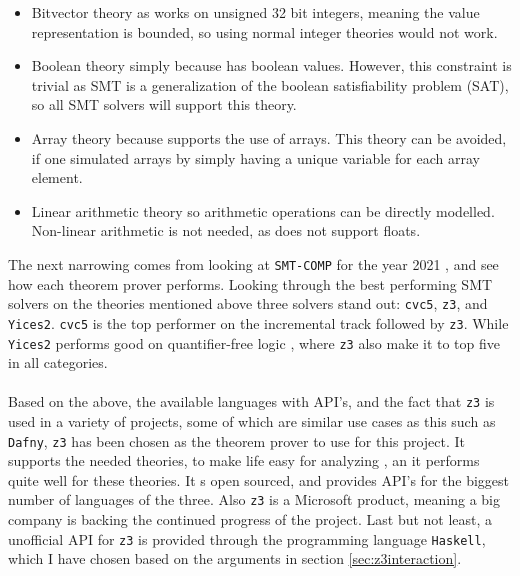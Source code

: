 \begin{itemize}
    \item Bitvector theory as \lan works on unsigned 32 bit integers, meaning the value
          representation is bounded, so using normal integer theories would not work.

    \item Boolean theory simply because \lan has boolean values. However, this constraint is
          trivial as SMT is a generalization of the boolean satisfiability problem (SAT), so
          all SMT solvers will support this theory.

    \item Array theory because \lan supports the use of arrays. This theory can be avoided, if
          one simulated arrays by simply having a unique variable for each array element.

    \item Linear arithmetic theory so arithmetic operations can be directly modelled. Non-linear
          arithmetic is not needed, as \lan does not support floats.
\end{itemize}
\noindent
The next narrowing comes from looking at \texttt{SMT-COMP} for the year 2021 \cite{smtcomp}, and see
how each theorem prover performs. Looking through the best performing SMT solvers on the theories
mentioned above three solvers stand out: \texttt{cvc5}, \texttt{z3}, and \texttt{Yices2}.
\texttt{cvc5} is the top performer on the incremental track \cite{smtcomincr} followed by
\texttt{z3}. While \texttt{Yices2} performs good on quantifier-free logic \cite{smtcommod},
where \texttt{z3} also make it to top five in all categories.
\\
\\
Based on the above, the available languages with API's, and the fact that \texttt{z3} is used in
a variety of projects, some of which are similar use cases as this such as \texttt{Dafny},
\texttt{z3} has been chosen as the theorem prover to use for this project. It supports the
needed theories, to make life easy for analyzing \lan, an it performs quite well for these
theories. It s open sourced, and provides API's for the biggest number of languages of the three.
Also \texttt{z3} is a Microsoft product, meaning a big company is backing the continued
progress of the project. Last but not least, a unofficial API for \texttt{z3} is provided
through the programming language \texttt{Haskell}, which I have chosen based on the arguments
in section \ref{sec:z3interaction}.


